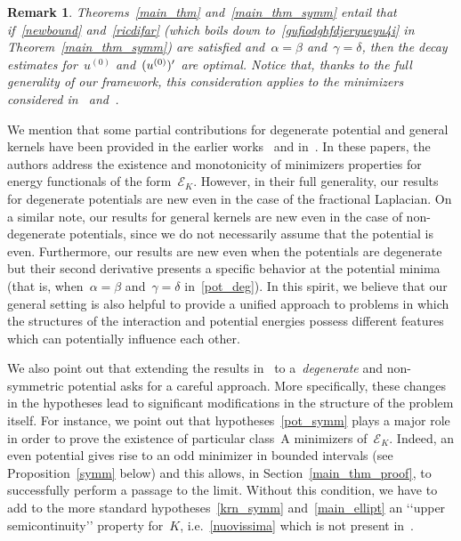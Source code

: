 \documentclass[10pt,a4paper]{amsart}
\newtheorem{rem}[theorem]{Remark}
\numberwithin{equation}{section}
\newcommand{\Ec}{\mathcal{E}_K}
\begin{document}
\begin{rem}\label{optimality}
{\rm Theorems~\ref{main_thm} and~\ref{main_thm_symm} entail that if~\eqref{newbound} and~\eqref{ricdifar} 
(which boils down to~\eqref{gufiodghfdjeryueyu4i} in Theorem~\ref{main_thm_symm})
are satisfied and~$\alpha=\beta$ and~$\gamma=\delta$, then the decay estimates for~$u^{(0)}$ and~$(u^{(0)})\rq{}$ are optimal. Notice that, thanks to the full generality of our framework, this consideration applies to the minimizers considered in~\cite[Theorem~2]{PSV13} and~\cite[Theorem~1]{CP16}.             
}
\end{rem}

We mention that some partial contributions for degenerate potential and general kernels have been provided in the earlier works~\cite{BB98,BBB98} and in~\cite{DT24}. In these papers, the authors address the existence and monotonicity of minimizers properties for energy functionals of the form~$\mathcal{E}_K$. However, in their full generality, our results for degenerate potentials are new even in the case of the fractional Laplacian.
On a similar note, our results for general kernels are new even in the case of non-degenerate potentials,
since we do not necessarily
assume that the potential is even. 
Furthermore, our results are new even when the potentials
are degenerate but their second derivative presents
a specific behavior at the potential minima (that is, when~$\alpha=\beta$ and~$\gamma=\delta$ in~\eqref{pot_deg}).
In this spirit, we believe that our general setting
is also helpful to provide a unified approach to problems in which the structures of the interaction and potential energies
possess different features which can potentially influence each other. 
 
We also point out that extending the results in~\cite{PSV13,CP16} to a~\textit{degenerate} and non-symmetric potential asks for a careful approach. More specifically, these changes in the hypotheses lead to significant modifications in the structure of the problem itself.
For instance, we point out that
hypotheses~\eqref{pot_symm} plays a major role in order to
prove the existence of particular class~A minimizers of~$\Ec$. Indeed, an even potential gives rise to an odd minimizer in bounded intervals (see Proposition~\ref{symm} below) and this allows, in Section~\ref{main_thm_proof}, to successfully perform a passage to the limit. Without this condition, we have to add to the more standard hypotheses~\eqref{krn_symm} and~\eqref{main_ellipt}
an \lq\lq{}upper semicontinuity\rq\rq{} property for~$K$, i.e.~\eqref{nuovissima} which is not present in~\cite{CP16}.
 
\end{document}
